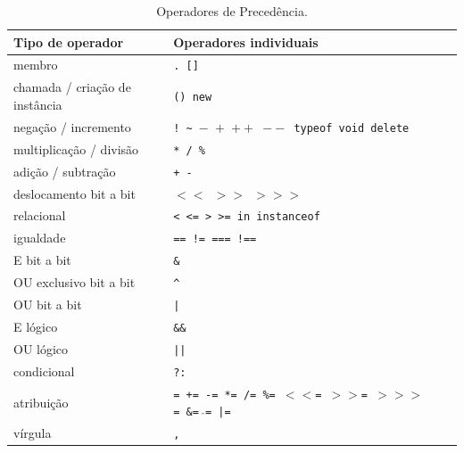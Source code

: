 \begin{table}[th]
\centering
\caption{Operadores de Precedência.}
\label{tab:jsPrecedenciaOperadores}
\begin{tabular}{llll}
Tipo de operador                &   Operadores individuais\\\hline
membro                          &   \texttt{. []}\\
chamada / criação de instância  &   \texttt{() new}\\
negação / incremento            &   \texttt{!~\textasciitilde~$-$~$+$~$++$~$--$~typeof void delete}\\
multiplicação / divisão         &   \texttt{* / \%}\\
adição / subtração              &   \texttt{+ -}\\
deslocamento bit a bit          &   \texttt{$<<$~$>>$~$>>>$}\\
relacional                      &   \texttt{< <= > >= in instanceof}\\
igualdade                       &   \texttt{== != === !==}\\
E bit a bit                     &   \texttt{\&}\\
OU exclusivo bit a bit          &   \texttt{\^}\\
OU bit a bit                    &   \texttt{|}\\
E lógico                        &   \texttt{\&\&}\\
OU lógico                       &   \texttt{||}\\
condicional                     &   \texttt{?:}\\
atribuição                      &   \texttt{= += -= *= /= \%=~$<<$=~$>>$=~$>>>$=~\&=~$\hat{}$= |=}\\
vírgula                         &   \texttt{,}\\
\hline
\end{tabular}
\begin{flushleft}
\end{flushleft}
\end{table}

